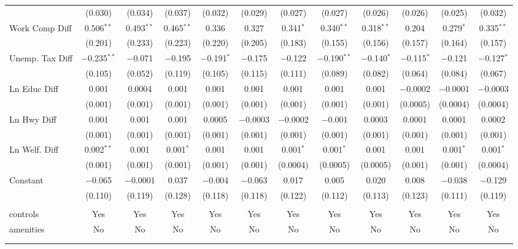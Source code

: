 \begin{table}[!htbp]
\begin{tabular}{@{\extracolsep{5pt}}lccccccccccc}
  & (0.030) & (0.034) & (0.037) & (0.032) & (0.029) & (0.027) & (0.027) & (0.026) & (0.026) & (0.025) & (0.032) \\ 
  Work Comp Diff & 0.506$^{**}$ & 0.493$^{**}$ & 0.465$^{**}$ & 0.336 & 0.327 & 0.341$^{*}$ & 0.340$^{**}$ & 0.318$^{**}$ & 0.204 & 0.279$^{*}$ & 0.335$^{**}$ \\ 
  & (0.201) & (0.233) & (0.223) & (0.220) & (0.205) & (0.183) & (0.155) & (0.156) & (0.157) & (0.164) & (0.157) \\ 
  Unemp. Tax Diff & $-$0.235$^{**}$ & $-$0.071 & $-$0.195 & $-$0.191$^{*}$ & $-$0.175 & $-$0.122 & $-$0.190$^{**}$ & $-$0.140$^{*}$ & $-$0.115$^{*}$ & $-$0.121 & $-$0.127$^{*}$ \\ 
  & (0.105) & (0.052) & (0.119) & (0.105) & (0.115) & (0.111) & (0.089) & (0.082) & (0.064) & (0.084) & (0.067) \\ 
  Ln Educ Diff & 0.001 & 0.0004 & 0.001 & 0.001 & 0.001 & 0.001 & 0.001 & 0.001 & $-$0.0002 & $-$0.0001 & $-$0.0003 \\ 
  & (0.001) & (0.001) & (0.001) & (0.001) & (0.001) & (0.001) & (0.001) & (0.001) & (0.0005) & (0.0004) & (0.0004) \\ 
  Ln Hwy Diff & 0.001 & 0.001 & 0.001 & 0.0005 & $-$0.0003 & $-$0.0002 & $-$0.001 & 0.0003 & 0.0001 & 0.0001 & 0.0002 \\ 
  & (0.001) & (0.001) & (0.001) & (0.001) & (0.001) & (0.001) & (0.001) & (0.001) & (0.001) & (0.001) & (0.001) \\ 
  Ln Welf. Diff & 0.002$^{**}$ & 0.001 & 0.001$^{*}$ & 0.001 & 0.001 & 0.001$^{*}$ & 0.001$^{*}$ & 0.001 & 0.001 & 0.001$^{*}$ & 0.001$^{*}$ \\ 
  & (0.001) & (0.001) & (0.001) & (0.001) & (0.001) & (0.0004) & (0.0005) & (0.0005) & (0.001) & (0.001) & (0.0004) \\ 
  Constant & $-$0.065 & $-$0.0001 & 0.037 & $-$0.004 & $-$0.063 & 0.017 & 0.005 & 0.020 & 0.008 & $-$0.038 & $-$0.129 \\ 
  & (0.110) & (0.119) & (0.128) & (0.118) & (0.118) & (0.122) & (0.112) & (0.113) & (0.123) & (0.111) & (0.119) \\ 
 \hline \\[-1.8ex] 
controls & Yes & Yes & Yes & Yes & Yes & Yes & Yes & Yes & Yes & Yes & Yes \\ 
amenities & No & No & No & No & No & No & No & No & No & No & No \\ 
\hline \\[-1.8ex] 
\hline 
\hline \\[-1.8ex] 
\end{tabular} 
\end{table} 
